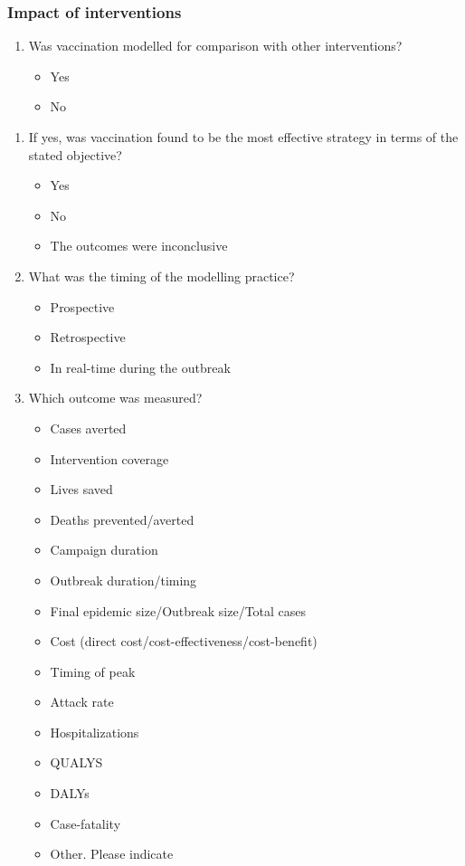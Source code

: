 \documentclass[10pt,a4paper]{article}
\begin{document}
	
	\subsubsection{Impact of interventions}
	\begin{enumerate}[resume]
		\item Was vaccination modelled for comparison with other interventions? 
		\begin{itemize}
			\item Yes 
			\item No
		\end{itemize}
	\end{enumerate}
	
	\begin{enumerate}[resume]
		\item If yes, was vaccination found to be the most effective strategy in terms of the stated objective? 
		\begin{itemize}
			\item 	Yes
			\item 	No
			\item 	The outcomes were inconclusive
		\end{itemize}
		\item What was the timing of the modelling practice? 
		\begin{itemize}
			\item Prospective
			\item Retrospective
			\item In real-time during the outbreak
		\end{itemize}
		\item Which outcome was measured?
		\begin{multicols}{2}
			\begin{itemize}
				\item Cases averted
				\item Intervention coverage
				\item Lives saved
				\item Deaths prevented/averted
				\item Campaign duration
				\item Outbreak duration/timing
				\item Final epidemic size/Outbreak size/Total cases
				\item Cost (direct cost/cost-effectiveness/cost-benefit)
				\item Timing of peak
				\item Attack rate
				\item Hospitalizations
				\item QUALYS
				\item DALYs
				\item Case-fatality
				\item Other. Please indicate
			\end{itemize}
		\end{multicols}
	\end{enumerate}
	
\end{document}
